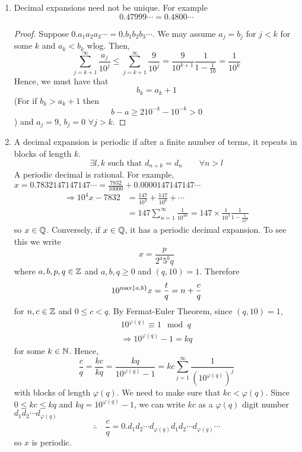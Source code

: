\documentclass{article}
\begin{document}
\begin{remark}\leavevmode
    \begin{enumerate}[label=(\arabic*)]
        \item Decimal expansions need not be unique. For example
        \[
            0.47999\cdots = 0.4800\cdots  
        \]
        \begin{proof}
            Suppose $0.a_1a_2a_3\cdots = 0.b_1b_2b_3\cdots$.
            We may assume $a_j = b_j$ for $j < k$ for some $k$
            and $a_k < b_k$ wlog.
            Then,
            \[
                \sum_{j = k+1}^\infty \frac{a_j}{10^j} \leq \sum_{j = k+1}^\infty \frac{9}{10^j} = \frac{9}{10^{k + 1}}\frac{1}{1 - \frac{1}{10}} = \frac{1}{10^k}
            \]
            Hence, we must have that
            \[
                b_k = a_k + 1  
            \]
            (For if $b_k > a_k +1$ then
            \[
                b - a \geq 2 10^{-k} - 10^{-k} > 0  
            \])
            and $a_j = 9$, $b_j =0$ $\forall j > k$.
        \end{proof}

        \item A decimal expansion is periodic if after a finite number of terms, it repeats in blocks of length $k$.
        \[
            \exists l, k \text{ such that } d_{n+k} = d_n \qquad \forall n > l  
        \]
        A periodic decimal is rational.
        For example, $x = 0.7832147147147\cdots = \frac{7832}{10000} + 0.0000147147147\cdots$
        \begin{align*}
            \Rightarrow 10^4x - 7832 &= \frac{147}{10^3} + \frac{147}{10^6} + \cdots \\
            &= 147 \sum_{n=1}^\infty \frac{1}{10^{3n}} = 147 \times \frac{1}{10^3} \frac{1}{1- \frac{1}{10^3}}
        \end{align*}
        so $x \in \mathbb{Q}$.
        Conversely, if $x \in \mathbb{Q}$, it has a periodic decimal expansion. To see this we write
        \[
            x = \frac{p}{2^a5^b q}  
        \]
        where $a, b, p, q \in \mathbb{Z}$ and $a, b, q \geq 0$ and $(q, 10) = 1$.
        Therefore
        \[
            10^{\max \left\{ a, b \right\}} x = \frac{t}{q} = n + \frac{c}{q}  
        \]
        for $n, c \in \mathbb{Z}$ and $0 \leq c < q$.
        By Fermat-Euler Theorem, since $(q, 10) = 1$,
        \begin{align*}
            10^{\varphi(q)} \equiv 1 \mod q \\
            \Rightarrow 10^{\varphi(q)} - 1 = kq
        \end{align*}
        for some $k \in \mathbb{N}$.
        Hence,
        \[
            \frac{c}{q} = \frac{kc}{kq} = \frac{kq}{10^{\varphi(q)} - 1} = kc \sum_{j=1}^\infty \frac{1}{(10^{\varphi(q)})^j}
        \]
        with blocks of length $\varphi(q)$. We need to make sure that $kc < \varphi(q)$.
        Since $0 \leq kc \leq kq$ and $kq = 10^{\varphi(q)} - 1$,
        we can write $kc$ as a $\varphi(q)$ digit number $d_1d_2\cdots d_{\varphi(q)}$
        \[
            \therefore \quad \frac{c}{q} = 0.d_1d_2\cdots d_{\varphi(q)}d_1d_2\cdots d_{\varphi(q)} \cdots
        \]
        so $x$ is periodic.
    \end{enumerate}
\end{remark}
\end{document}
